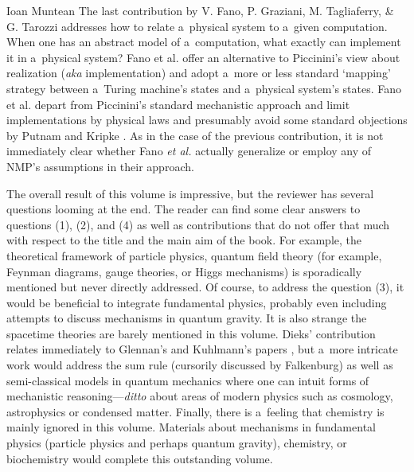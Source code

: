 \begin{recengenv}{Ioan Muntean}
The last contribution by V. Fano, P. Graziani, M. Tagliaferry, \& G. Tarozzi addresses how to relate a~physical system to a~given computation. When one has an abstract model of a~computation, what exactly can implement it in a~physical system? Fano et al. offer an alternative to Piccinini's
\parencite*[][]{piccinini_physical_2015} %
 view about realization (\textit{aka} implementation) and adopt a~more or less standard ‘mapping' strategy between a~Turing machine's states and a~physical system's states. Fano et al. depart from Piccinini's standard mechanistic approach and limit implementations by physical laws and presumably avoid some standard objections by Putnam and Kripke 
\parencite*[][pp.217–218]{falkenburg_mechanistic_2019}. %
 As in the case of the previous contribution, it is not immediately clear whether Fano \textit{et al.} actually generalize or employ any of NMP's assumptions in their approach.

The overall result of this volume is impressive, but the reviewer has several questions looming at the end. The reader can find some clear answers to questions (1), (2), and (4) as well as contributions that do not offer that much with respect to the title and the main aim of the book. For example, the theoretical framework of particle physics, quantum field theory (for example, Feynman diagrams, gauge theories, or Higgs mechanisms) is sporadically mentioned but never directly addressed. Of course, to address the question (3), it would be beneficial to integrate fundamental physics, probably even including attempts to discuss mechanisms in quantum gravity. It is also strange the spacetime theories are barely mentioned in this volume. Dieks' contribution relates immediately to Glennan's and Kuhlmann's papers
\parencites[][]{kuhlmann_relation_2014}[][]{kuhlmann_mechanisms_2017}, %
 but a~more intricate work would address the sum rule (cursorily discussed by Falkenburg) as well as semi-classical models in quantum mechanics where one can intuit forms of mechanistic reasoning---\textit{ditto} about areas of modern physics such as cosmology, astrophysics or condensed matter. Finally, there is a~feeling that chemistry is mainly ignored in this volume. Materials about mechanisms in fundamental physics (particle physics and perhaps quantum gravity), chemistry, or biochemistry would complete this outstanding volume.


\end{recengenv}
